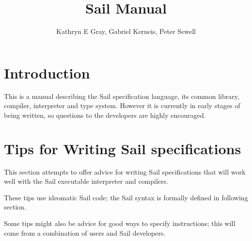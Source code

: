 \documentclass[11pt]{article}
\begin{document}


\title{Sail Manual}
\author{Kathryn E Gray, Gabriel Kerneis, Peter Sewell}

\maketitle

\tableofcontents

\newpage

\section{Introduction}

This is a manual describing the Sail specification language, its
common library, compiler, interpreter and type system. However it is
currently in early stages of being written, so questions to the
developers are highly encouraged.

\section{Tips for Writing Sail specifications}

This section attempts to offer advice for writing Sail specifications
that will work well with the Sail executable interpreter and
compilers.

These tips use ideomatic Sail code; the Sail syntax is formally
defined in following section.

Some tips might also be advice for good ways to specify instructions;
this will come from a combination of users and Sail developers.
\end{document}
